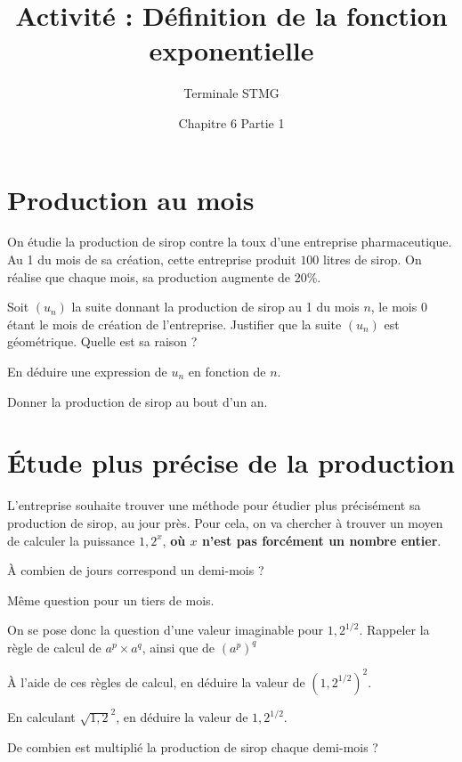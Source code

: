 \documentclass{exos}
\author{Terminale STMG}
\title{Activité : Définition de la fonction exponentielle}
\date{Chapitre 6 Partie 1}
\begin{document}
\maketitle

\section{Production au mois}
On étudie la production de sirop contre la toux d'une entreprise pharmaceutique. Au 1\ier{} du mois de sa création, cette entreprise produit $100$ litres de sirop. On réalise que chaque mois, sa production augmente de $20\%$.
\begin{alphaquestions}
\item Soit $(u_n)$ la suite donnant la production de sirop au 1\ier{} du mois $n$, le mois $0$ étant le mois de création de l'entreprise. Justifier que la suite $(u_n)$ est géométrique. Quelle est sa raison ?
\item En déduire une expression de $u_n$ en fonction de $n$.
\item Donner la production de sirop au bout d'un an.
\end{alphaquestions}

\section{Étude plus précise de la production}

L'entreprise souhaite trouver une méthode pour étudier plus précisément sa production de sirop, au jour près. Pour cela, on va chercher à trouver un moyen de calculer la puissance $1,2^x$, \textbf{où $x$ n'est pas forcément un nombre entier}.
\begin{alphaquestions}
\item À combien de jours correspond un demi-mois ? 
\item Même question pour un tiers de mois.
\item On se pose donc la question d'une valeur imaginable pour $1,2^{1/2}$. Rappeler la règle de calcul de $a^p \times a^q$, ainsi que de $(a^p)^q$
\item À l'aide de ces règles de calcul, en déduire la valeur de $(1,2^{1/2})^2$.
\item En calculant $\sqrt{1,2}^2$, en déduire la valeur de $1,2^{1/2}$.
\item De combien est multiplié la production de sirop chaque demi-mois ?    
\end{alphaquestions}
\end{document}
